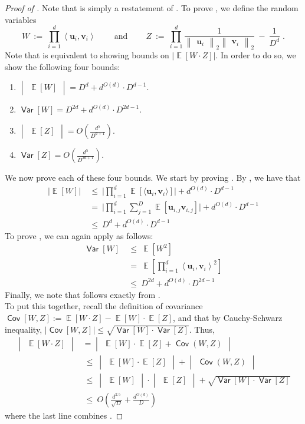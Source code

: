 \documentclass[11pt]{article}
\newcommand{\inparen}[1]{\left ( #1 \right )}
\newcommand{\insquare}[1]{\left [ #1 \right ]}
\newcommand{\inangle}[1]{\left \langle #1 \right \rangle}
\newcommand{\inabs}[1]{\begin{vmatrix} #1 \end{vmatrix}}
\newcommand{\norm}[2]{\begin{Vmatrix} #2 \end{Vmatrix}_{#1}}
\DeclareMathOperator*{\Ex}{\mathbb{E}}
\DeclareMathOperator*{\Var}{\mathsf{Var}}
\DeclareMathOperator*{\Cov}{\mathsf{Cov}}
\newcommand{\sAND}{\ \mathrm{and} \ }
\newcommand{\bu}{{\bm u}}
\newcommand{\bv}{{\bm v}}
\begin{document}
\begin{proof}[Proof of ]
	\noindent Note that  is simply a restatement of . To prove , we define the random variables
	\[ W ~:=~ \prod_{i=1}^d \inangle{\bu_i, \bv_i} \qquad \sAND \qquad Z ~:=~ \prod_{i=1}^d \frac{1}{\norm{2}{\bu_i} \norm{2}{\bv_i}} ~-~ \frac{1}{D^d}\;. \]
	Note that  is equivalent to showing bounds on $|\Ex[W \cdot Z]|$. In order to do so, we show the following four bounds:
	\begin{enumerate}
		\item\label{it:W_mean} $\inabs{\Ex[W]} = D^d + d^{O(d)} \cdot D^{d-1}$.
		\item\label{it:W_var} $\Var[W] = D^{2d} + d^{O(d)} \cdot D^{2d-1}$.
		\item\label{it:Z_mean} $\inabs{\Ex[Z]} = O\inparen{\frac{d^5}{D^{d+1}}}$. 
		\item\label{it:Z_var} $\Var[Z] = O\inparen{\frac{d^5}{D^{2d+1}}}$. 
	\end{enumerate}
	We now prove each of these four bounds. We start by proving . By , we have that
	\begin{align*}
		|\Ex[W]|
		&~\le~ \bigg| \prod_{i=1}^d  \Ex [ \langle \bu_i, \bv_i \rangle ] \bigg| + d^{O(d)} \cdot D^{d-1}\\
		&~=~ \bigg| \prod_{i=1}^d \sum_{j=1}^D \Ex[\bu_{i,j} \bv_{i,j}] \bigg| + d^{O(d)} \cdot D^{d-1}\\
		&~\le~ D^d + d^{O(d)} \cdot D^{d-1}
	\end{align*}
	To prove , we can again apply  as follows:
	\begin{align*}
		\Var[W] &~\le~ \Ex[W^2]\\
		&~=~ \Ex \insquare{\prod_{i=1}^{d} \inangle{\bu_i, \bv_i}^2}\\
		&~\le~ D^{2d} + d^{O(d)} \cdot D^{2d-1}
	\end{align*}
	Finally, we note that  follows exactly from .\\
	
	\noindent To put this together, recall the definition of covariance $\Cov[W,Z] := \Ex[W \cdot Z] - \Ex[W] \cdot \Ex[Z]$, and that by Cauchy-Schwarz inequality, $|\Cov[W,Z]| \le \sqrt{\Var[W] \cdot \Var[Z]}$. Thus,
	\begin{align*}
	\inabs{\Ex[W \cdot Z]} &= \inabs{\Ex[W] \cdot \Ex[Z] + \Cov(W,Z)}\\ 
	&~\le~ \inabs{\Ex[W] \cdot \Ex[Z]} + \inabs{\Cov(W,Z)}\\ 
	&~\le~ \inabs{\Ex[W]} \cdot \inabs{\Ex[Z]} + \sqrt{\Var[W] \cdot \Var[Z]}\\
	&~\le~ O\inparen{\frac{d^{2.5}}{\sqrt{D}} + \frac{d^{O(d)}}{D}}
	\end{align*}
	where the last line combines .
\end{proof}
\end{document}
